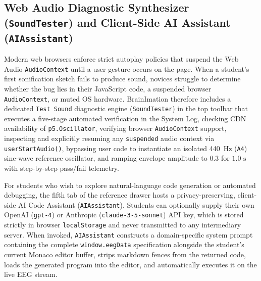 \documentclass[10pt,twocolumn]{article}
\begin{document}
\subsection{Web Audio Diagnostic Synthesizer (\texttt{SoundTester}) and Client-Side AI Assistant (\texttt{AIAssistant})}
Modern web browsers enforce strict autoplay policies that suspend the Web Audio \texttt{AudioContext} until a user gesture occurs on the page. When a student's first sonification sketch fails to produce sound, novices struggle to determine whether the bug lies in their JavaScript code, a suspended browser \texttt{AudioContext}, or muted OS hardware. BrainImation therefore includes a dedicated \texttt{Test Sound} diagnostic engine (\texttt{SoundTester}) in the top toolbar that executes a five-stage automated verification in the System Log, checking CDN availability of \texttt{p5.Oscillator}, verifying browser \texttt{AudioContext} support, inspecting and explicitly resuming any \texttt{suspended} audio context via \texttt{userStartAudio()}, bypassing user code to instantiate an isolated 440~Hz (\texttt{A4}) sine-wave reference oscillator, and ramping envelope amplitude to $0.3$ for $1.0\text{ s}$ with step-by-step pass/fail telemetry.

For students who wish to explore natural-language code generation or automated debugging, the fifth tab of the reference drawer hosts a privacy-preserving, client-side AI Code Assistant (\texttt{AIAssistant}). Students can optionally supply their own OpenAI (\texttt{gpt-4}) or Anthropic (\texttt{claude-3-5-sonnet}) API key, which is stored strictly in browser \texttt{localStorage} and never transmitted to any intermediary server. When invoked, \texttt{AIAssistant} constructs a domain-specific system prompt containing the complete \texttt{window.eegData} specification alongside the student's current Monaco editor buffer, strips markdown fences from the returned code, loads the generated program into the editor, and automatically executes it on the live EEG stream.
\end{document}
